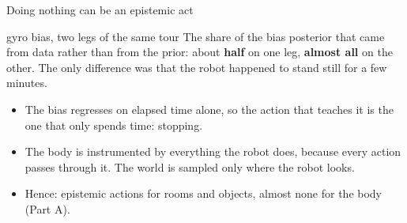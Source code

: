 \begin{frame}{Doing nothing can be an epistemic act}
  \begin{measured}{gyro bias, two legs of the same tour}
    The share of the bias posterior that came from data rather than from the prior: about
    \textbf{half} on one leg, \textbf{almost all} on the other. The only difference was that the
    robot happened to stand still for a few minutes.
  \end{measured}
  \begin{itemize}
    \item The bias regresses on elapsed time alone, so the action that teaches it is the one that
          only spends time: \alert{stopping}.
    \item The body is instrumented by everything the robot does, because every action passes
          through it. The world is sampled only where the robot looks.
    \item Hence: epistemic actions for rooms and objects, almost none for the body (Part A).
  \end{itemize}
\end{frame}

